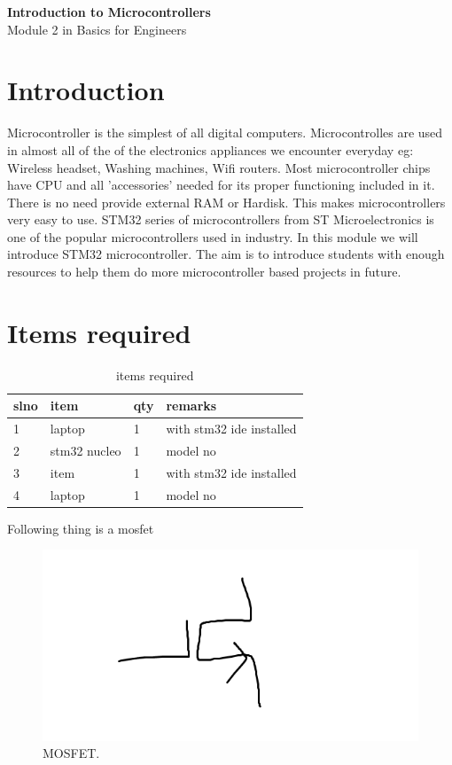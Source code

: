 \documentclass[11pt]{article}
\begin{document}
 
\begin{titlepage}
\begin{center}
\vspace*{10cm}
\huge \textbf{ Introduction to Microcontrollers } \\ 
\Large Module 2 in Basics for Engineers
\vfill
\end{center}
\end{titlepage}

\section{Introduction}
Microcontroller is the simplest of all digital computers. Microcontrolles are used in almost all of the of the electronics appliances we encounter everyday eg: Wireless headset, Washing machines, Wifi routers. Most microcontroller chips have CPU and all 'accessories' needed for its proper functioning included in it. There is no need provide external RAM or Hardisk. This makes microcontrollers very easy to use.
STM32 series of microcontrollers from ST Microelectronics is one of the popular microcontrollers used in industry.
In this module we will introduce STM32 microcontroller. The aim is to introduce students with enough resources to help them do more microcontroller based projects in future.

\section{Items required}
\begin{table}[h!]
\begin{center}
\caption{items required}
\label{tab:table1}
\begin{tabular}{l|l|l|l}
\textbf{slno} & \textbf{item} & \textbf{qty} & \textbf{remarks}\\
\hline
1 & laptop & 1 & with stm32 ide installed\\
2 & stm32 nucleo & 1 & model no\\
3 & item & 1 & with stm32 ide installed\\
4 & laptop & 1 & model no\\
\hline
\end{tabular}
\end{center}
\end{table}


Following thing is a mosfet

\begin{figure}[h!]
\includegraphics[width=\linewidth]{MOSFET.jpg}
\caption{MOSFET.}
\label{figure1}
\end{figure}
\end{document}
